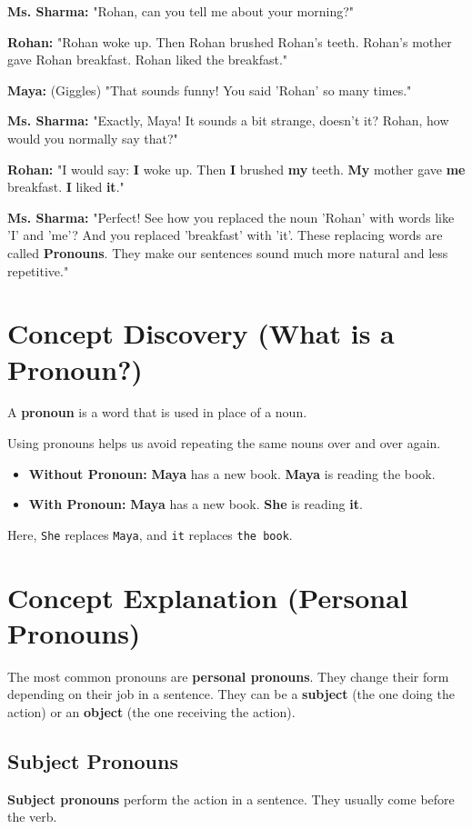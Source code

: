\textbf{Ms. Sharma:} "Rohan, can you tell me about your morning?"

\textbf{Rohan:} "Rohan woke up. Then Rohan brushed Rohan's teeth. Rohan's mother gave Rohan breakfast. Rohan liked the breakfast."

\textbf{Maya:} (Giggles) "That sounds funny! You said 'Rohan' so many times."

\textbf{Ms. Sharma:} "Exactly, Maya! It sounds a bit strange, doesn't it? Rohan, how would you normally say that?"

\textbf{Rohan:} "I would say: \textbf{I} woke up. Then \textbf{I} brushed \textbf{my} teeth. \textbf{My} mother gave \textbf{me} breakfast. \textbf{I} liked \textbf{it}."

\textbf{Ms. Sharma:} "Perfect! See how you replaced the noun 'Rohan' with words like 'I' and 'me'? And you replaced 'breakfast' with 'it'. These replacing words are called \textbf{Pronouns}. They make our sentences sound much more natural and less repetitive."

\section{Concept Discovery (What is a Pronoun?)}
A \textbf{pronoun} is a word that is used in place of a noun.

Using pronouns helps us avoid repeating the same nouns over and over again.

\begin{itemize}
    \item \textbf{Without Pronoun:} \textbf{Maya} has a new book. \textbf{Maya} is reading the book.
    \item \textbf{With Pronoun:} \textbf{Maya} has a new book. \textbf{She} is reading \textbf{it}.
\end{itemize}

Here, \texttt{She} replaces \texttt{Maya}, and \texttt{it} replaces \texttt{the book}.

\section{Concept Explanation (Personal Pronouns)}
The most common pronouns are \textbf{personal pronouns}. They change their form depending on their job in a sentence. They can be a \textbf{subject} (the one doing the action) or an \textbf{object} (the one receiving the action).

\subsection*{Subject Pronouns}
\textbf{Subject pronouns} perform the action in a sentence. They usually come before the verb.


